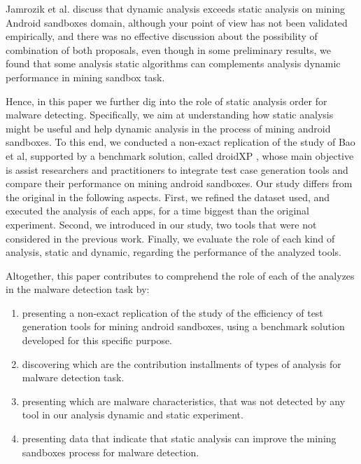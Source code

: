 Jamrozik et al. \cite{jamrozik2016mining} discuss that dynamic analysis exceeds static analysis on mining Android sandboxes domain, although your point of view has not been validated empirically, and there was no effective discussion about the possibility of combination of both proposals, even though in some preliminary results, we found that some analysis static algorithms can complements analysis dynamic performance in mining sandbox task.

Hence, in this paper we further dig into the role of static analysis order for malware detecting. Specifically, we aim at understanding how static analysis might be useful and help dynamic analysis in the process of mining android sandboxes. To this end, we conducted a non-exact replication of the study of Bao et al, supported by a benchmark solution, called droidXP \cite{dadroidxp}, whose main objective is assist researchers and practitioners to integrate test case generation tools and compare their performance on mining android sandboxes. Our study differs from the original in the following aspects. First, we refined the dataset used, and executed the analysis of each apps, for a time biggest than the original experiment. Second, we introduced in our study, two tools that were not considered in the previous work. Finally, we evaluate the role of each kind of analysis, static and dynamic, regarding the performance of the analyzed tools.

Altogether, this paper contributes to comprehend the role of each of the analyzes in the malware detection task by:

\begin{enumerate}[(1)]
 \item presenting a non-exact replication of the study of the efficiency of test generation tools for mining android sandboxes, using a benchmark solution developed for this specific purpose.
 
 \item discovering which are the contribution installments of types of analysis for malware detection task.
 
 \item presenting which are malware characteristics, that was not detected by any tool in our analysis dynamic and static experiment.
 
 \item presenting data that indicate that static analysis can improve the mining sandboxes process for malware detection.
 \end{enumerate}
 
